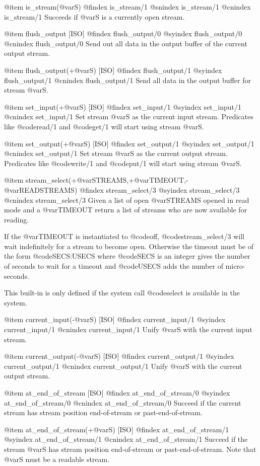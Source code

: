 {{{{{@item is_stream(@var{S})
@findex is_stream/1
@snindex is_stream/1
@cnindex is_stream/1
Succeeds if @var{S} is a currently open stream.

@item flush_output [ISO]
@findex flush_output/0
@syindex flush_output/0
@cnindex flush_output/0
Send out all data in the output buffer of the current output stream.

@item flush_output(+@var{S}) [ISO]
@findex flush_output/1
@syindex flush_output/1
@cnindex flush_output/1
Send all data in the output buffer for stream @var{S}.

@item set_input(+@var{S}) [ISO]
@findex set_input/1
@syindex set_input/1
@cnindex set_input/1
Set stream @var{S} as the current input stream. Predicates like @code{read/1}
and @code{get/1} will start using stream @var{S}.

@item set_output(+@var{S}) [ISO]
@findex set_output/1
@syindex set_output/1
@cnindex set_output/1
Set stream @var{S} as the current output stream. Predicates like
@code{write/1} and @code{put/1} will start using stream @var{S}.

@item stream_select(+@var{STREAMS},+@var{TIMEOUT},-@var{READSTREAMS})
@findex stream_select/3
@syindex stream_select/3
@cnindex stream_select/3
Given a list of open @var{STREAMS} opened in read mode and a @var{TIMEOUT}
return a list of streams who are now available for reading. 

If the @var{TIMEOUT} is instantiated to @code{off},
@code{stream_select/3} will wait indefinitely for a stream to become
open. Otherwise the timeout must be of the form @code{SECS:USECS} where
@code{SECS} is an integer gives the number of seconds to wait for a timeout
and @code{USECS} adds the number of micro-seconds.

This built-in is only defined if the system call @code{select} is
available in the system.

@item current_input(-@var{S}) [ISO]
@findex current_input/1
@syindex current_input/1
@cnindex current_input/1
Unify @var{S} with the current input stream.

@item current_output(-@var{S}) [ISO]
@findex current_output/1
@syindex current_output/1
@cnindex current_output/1
Unify @var{S} with the current output stream.

@item at_end_of_stream [ISO]
@findex at_end_of_stream/0
@syindex at_end_of_stream/0
@cnindex at_end_of_stream/0
Succeed if the current stream has stream position end-of-stream or
past-end-of-stream.

@item at_end_of_stream(+@var{S}) [ISO]
@findex at_end_of_stream/1
@syindex at_end_of_stream/1
@cnindex at_end_of_stream/1
Succeed if the stream @var{S} has stream position end-of-stream or
past-end-of-stream. Note that @var{S} must be a readable stream.

}}}}}
